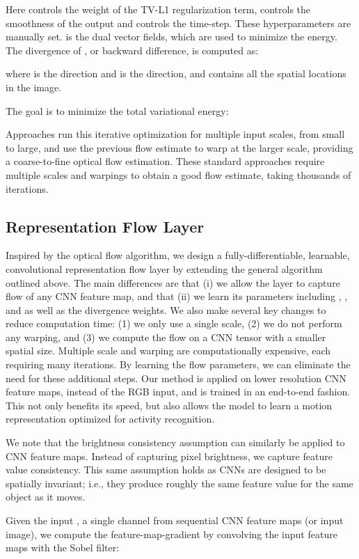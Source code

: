 \documentclass[10pt,twocolumn,letterpaper]{article}
\begin{document}
Here  controls the weight of the TV-L1 regularization term,  controls the smoothness of the output and  controls the time-step. These hyperparameters are manually set.  is the dual vector fields, which are used to minimize the energy. The divergence of , or backward difference, is computed as:

where  is the  direction and  is the  direction, and  contains all the spatial locations in the image.

The goal is to minimize the total variational energy:


Approaches run this iterative optimization for multiple input scales, from small to large, and use the previous flow estimate  to warp  at the larger scale, providing a coarse-to-fine optical flow estimation. These standard approaches require multiple scales and warpings to obtain a good flow estimate, taking thousands of iterations.

\subsection{Representation Flow Layer}
Inspired by the optical flow algorithm, we design a fully-differentiable, learnable, convolutional representation flow layer by extending the general algorithm outlined above. The main differences are that (i) we allow the layer to capture flow of any CNN feature map, and that (ii) we learn its parameters including , , and  as well as the divergence weights. We also make several key changes to reduce computation time: (1) we only use a single scale, (2) we do not perform any warping, and (3) we compute the flow on a CNN tensor with a smaller spatial size. Multiple scale and warping are computationally expensive, each requiring many iterations. By learning the flow parameters, we can eliminate the need for these additional steps. Our method is applied on lower resolution CNN feature maps, instead of the RGB input, and is trained in an end-to-end fashion. This not only benefits its speed, but also allows the model to learn a motion representation optimized for activity recognition.

We note that the brightness consistency assumption can similarly be applied to CNN feature maps. Instead of capturing pixel brightness, we capture feature value consistency. This same assumption holds as CNNs are designed to be spatially invariant; i.e., they  produce roughly the same feature value for the same object as it moves.

Given the input , a single channel from sequential CNN feature maps (or input image), we compute the feature-map-gradient by convolving the input feature maps with the Sobel filter:
\end{document}
